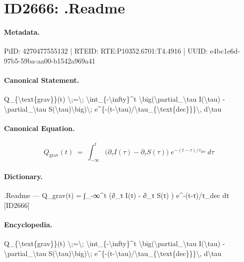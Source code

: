 \section*{ID2666: .Readme}
\paragraph{Metadata.}
PiID: 4270477555132 | RTEID: RTE:P10352.6701:T4.4916 | UUID: e4bc1e6d-97b5-59ba-aa00-b1542a969a41

\paragraph{Canonical Statement.}
Q\_\{\textbackslash{}text\{grav\}\}(t) \textbackslash{};=\textbackslash{}; \textbackslash{}int\_\{-\textbackslash{}infty\}\textasciicircum{}t \textbackslash{}big(\textbackslash{}partial\_\textbackslash{}tau I(\textbackslash{}tau) - \textbackslash{}partial\_\textbackslash{}tau S(\textbackslash{}tau)\textbackslash{}big)\textbackslash{}; e\textasciicircum{}\{-(t-\textbackslash{}tau)/\textbackslash{}tau\_\{\textbackslash{}text\{dec\}\}\}\textbackslash{}, d\textbackslash{}tau

\paragraph{Canonical Equation.}
\[
Q_{\text{grav}}(t) \;=\; \int_{-\infty}^t \big(\partial_\tau I(\tau) - \partial_\tau S(\tau)\big)\; e^{-(t-\tau)/\tau_{\text{dec}}}\, d\tau
\]

\paragraph{Dictionary.}
.Readme — Q\_grav(t) = ∫\_-∞\textasciicircum{}t (∂\_τ I(τ) - ∂\_τ S(τ) ) e\textasciicircum{}-(t-τ)/τ\_dec dτ [ID2666]

\paragraph{Encyclopedia.}
Q\_\{\textbackslash{}text\{grav\}\}(t) \textbackslash{};=\textbackslash{}; \textbackslash{}int\_\{-\textbackslash{}infty\}\textasciicircum{}t \textbackslash{}big(\textbackslash{}partial\_\textbackslash{}tau I(\textbackslash{}tau) - \textbackslash{}partial\_\textbackslash{}tau S(\textbackslash{}tau)\textbackslash{}big)\textbackslash{}; e\textasciicircum{}\{-(t-\textbackslash{}tau)/\textbackslash{}tau\_\{\textbackslash{}text\{dec\}\}\}\textbackslash{}, d\textbackslash{}tau
